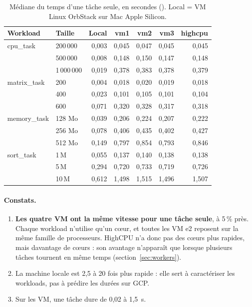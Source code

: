 \begin{table}[H]
\centering\small
\begin{tabular}{llrrrrr}
\toprule
\textbf{Workload} & \textbf{Taille} & \textbf{Local} & \textbf{vm1} & \textbf{vm2} & \textbf{vm3} & \textbf{highcpu} \\
\midrule
cpu\_task    & 200\,000   & 0,003 & 0,045 & 0,047 & 0,045 & 0,045 \\
             & 500\,000   & 0,008 & 0,148 & 0,150 & 0,147 & 0,148 \\
             & 1\,000\,000& 0,019 & 0,378 & 0,383 & 0,378 & 0,379 \\
matrix\_task & 200        & 0,004 & 0,018 & 0,020 & 0,019 & 0,018 \\
             & 400        & 0,023 & 0,101 & 0,105 & 0,101 & 0,104 \\
             & 600        & 0,071 & 0,320 & 0,328 & 0,317 & 0,318 \\
memory\_task & 128 Mo     & 0,039 & 0,206 & 0,224 & 0,207 & 0,222 \\
             & 256 Mo     & 0,078 & 0,406 & 0,435 & 0,402 & 0,427 \\
             & 512 Mo     & 0,149 & 0,797 & 0,854 & 0,793 & 0,846 \\
sort\_task   & 1\,M       & 0,055 & 0,137 & 0,140 & 0,138 & 0,138 \\
             & 5\,M       & 0,294 & 0,720 & 0,733 & 0,719 & 0,726 \\
             & 10\,M      & 0,612 & 1,498 & 1,515 & 1,496 & 1,507 \\
\bottomrule
\end{tabular}
\caption{Médiane du temps d'une tâche seule, en secondes (). Local = VM Linux OrbStack sur Mac Apple Silicon.}
\label{tab:bench}
\end{table}

\paragraph{Constats.}
\begin{enumerate}
  \item \textbf{Les quatre VM ont la même vitesse pour une tâche seule}, à 5\,\%
        près. Chaque workload n'utilise qu'un cœur, et toutes les VM e2 reposent
        sur la même famille de processeurs. HighCPU n'a donc pas des cœurs plus
        rapides, mais davantage de cœurs : son avantage n'apparaît que lorsque
        plusieurs tâches tournent en même temps (section~\ref{sec:workers}).
  \item La machine locale est 2,5 à 20 fois plus rapide : elle sert à caractériser
        les workloads, pas à prédire les durées sur GCP.
  \item Sur les VM, une tâche dure de 0,02 à 1,5~s.
\end{enumerate}

